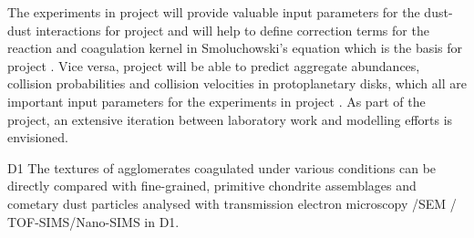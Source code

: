 \begin{linkproj}
\item[\projdul{}] The experiments in project \projblum{} will
provide valuable input parameters for the dust-dust interactions
for project \projdul{} and will help to define correction terms
for the reaction and coagulation kernel in Smoluchowski's equation
which is the basis for project \projdul{}. Vice versa, project
\projdul{} will be able to predict aggregate abundances, collision
probabilities and collision velocities in protoplanetary disks,
which all are important input parameters for the experiments in
project \projblum{}. As part of the project, an extensive
iteration between laboratory work and modelling efforts is
envisioned.

\item[D1] The textures of agglomerates coagulated under various conditions 
can be directly compared with fine-grained, primitive chondrite assemblages
and cometary dust particles analysed with transmission electron microscopy
/SEM / TOF-SIMS/Nano-SIMS in D1.

\end{linkproj}



